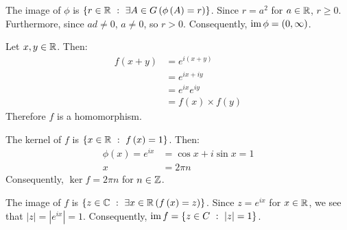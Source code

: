 \documentclass{article}
\begin{document}
The image of $\phi$ is $\left\{r \in \mathbb{R} \ : \  \exists A \in G \left(\phi\left(A\right) = r\right)\right\}$. Since $r = a^2$ for $a \in \mathbb{R}$, $r \geq 0$. Furthermore, since $ad \neq 0$, $a \neq 0$, so $r > 0$. Consequently, $\operatorname{im}\phi = \left(0, \infty\right)$.

\newpage


Let $x, y \in \mathbb{R}$. Then:
\begin{equation}
    \begin{split}
        f\left(x + y\right) & = e^{i\left(x + y\right)} \\
        & = e^{ix + iy} \\
        & = e^{ix}e^{iy} \\
        & = f\left(x\right) \times f\left(y\right)
    \end{split}
\end{equation}
Therefore $f$ is a homomorphism.

The kernel of $f$ is $\left\{x \in \mathbb{R} \ : \  f\left(x\right) = 1\right\}$. Then:
\begin{equation}
    \begin{split}
        \phi\left(x\right) = e^{ix} & = \cos x + i\sin x = 1 \\
        x & = 2\pi n
    \end{split}
\end{equation}
Consequently, $\ker f = 2\pi n$ for $n \in \mathbb{Z}$.

The image of $f$ is $\left\{z \in \mathbb{C} \ : \  \exists x \in \mathbb{R} \left(f\left(x\right) = z\right)\right\}$. Since $z = e^{ix}$ for $x \in \mathbb{R}$, we see that $|z| = |e^{ix}| = 1$. Consequently, $\operatorname{im} f = \left\{z \in C \ : \  |z| = 1\right\}$.
\end{document}
